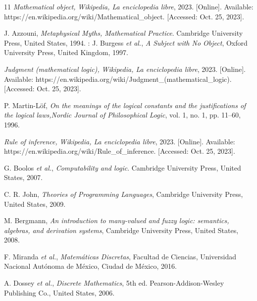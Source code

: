 \begin{thebibliography}{11}
    \label{sec:58}
    \hypertarget{58}{}
    \textit{Mathematical object, }\textit{Wikipedia, La enciclopedia libre}, 2023. [Online]. Available: https://en.wikipedia.org/wiki/Mathematical\_object. [Accessed: Oct. 25, 2023].

    \label{sec:59}
    \hypertarget{59}{}
    J. Azzouni, \textit{Metaphysical Myths, Mathematical Practice}. Cambridge University Press, United States, 1994.
:
    \label{sec:60}
    \hypertarget{60}{}
    J. Burgess \textit{et al.}, \textit{A Subject with No Object}, Oxford University Press,  United Kingdom, 1997.
    
    \label{sec:61}
    \hypertarget{61}{}
    \textit{Judgment (mathematical logic), }\textit{Wikipedia, La enciclopedia libre}, 2023. [Online]. Available: https://en.wikipedia.org/wiki/Judgment\_(mathematical\_logic). [Accessed: Oct. 25, 2023].

    \label{sec:62}
    \hypertarget{62}{}
    P. Martin-Löf, \textit{On the meanings of the logical constants and the justifications of the logical laws,}\textit{Nordic Journal of Philosophical Logic}, vol. 1, no. 1, pp. 11–60, 1996.

    \label{sec:63}
    \hypertarget{63}{}
    \textit{Rule of inference, }\textit{Wikipedia, La enciclopedia libre}, 2023. [Online]. Available: https://en.wikipedia.org/wiki/Rule\_of\_inference. [Accessed: Oct. 25, 2023].

    \label{sec:64}
    \hypertarget{64}{}
    G. Boolos \textit{et al.}, \textit{Computability and logic}. Cambridge University Press, United States, 2007.

    \label{sec:65}
    \hypertarget{65}{}
    C. R. John, \textit{Theories of Programming Languages}, Cambridge University Press, United States, 2009.
    
    \label{sec:66}
    \hypertarget{66}{}
    M. Bergmann, \textit{An introduction to many-valued and fuzzy logic: semantics, algebras, and derivation systems}, Cambridge University Press, United States, 2008.

    \label{sec:67}
    \hypertarget{67}{}
    F. Miranda \textit{et al.}, \textit{Matemáticas Discretas}, Facultad de Ciencias, Universidad Nacional Autónoma de México, Ciudad de México, 2016.

    \label{sec:68}
    \hypertarget{68}{}
    A. Dossey \textit{et al.}, \textit{Discrete Mathematics}, 5th ed. Pearson-Addison-Wesley Publishing Co., United States, 2006.


\end{thebibliography}
